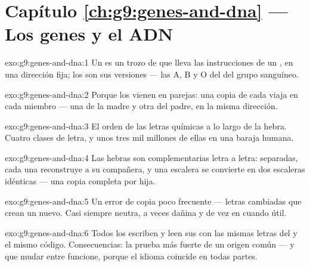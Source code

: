 \section*{Capítulo \ref{ch:g9:genes-and-dna} --- Los genes y el ADN}

\begin{solution}{exo:g9:genes-and-dna:1}
Un  es un trozo de  que lleva las instrucciones de un
, en una dirección fija; los  son sus versiones --- las A, B
y O del  del grupo sanguíneo.
\end{solution}

\begin{solution}{exo:g9:genes-and-dna:2}
Porque los  vienen en parejas: una copia de cada  viaja en
cada miembro --- una de la madre y otra del padre, en la misma
dirección.
\end{solution}

\begin{solution}{exo:g9:genes-and-dna:3}
El orden de las letras químicas a lo largo de la hebra. Cuatro clases
de letra, y unos tres mil millones de ellas en una baraja humana.
\end{solution}

\begin{solution}{exo:g9:genes-and-dna:4}
Las hebras son complementarias letra a letra: separadas, cada una
reconstruye a su compañera, y una escalera se convierte en dos
escaleras idénticas --- una copia completa por  hija.
\end{solution}

\begin{solution}{exo:g9:genes-and-dna:5}
Un error de copia poco frecuente --- letras cambiadas que crean un
 nuevo. Casi siempre neutra, a veces dañina y de vez en cuando
útil.
\end{solution}

\begin{solution}{exo:g9:genes-and-dna:6}
Todos los  escriben y leen sus  con las mismas letras
del  y el mismo código. Consecuencias: la prueba más fuerte de un
origen común --- y que mudar  entre  funcione, porque el
idioma coincide en todas partes.
\end{solution}

